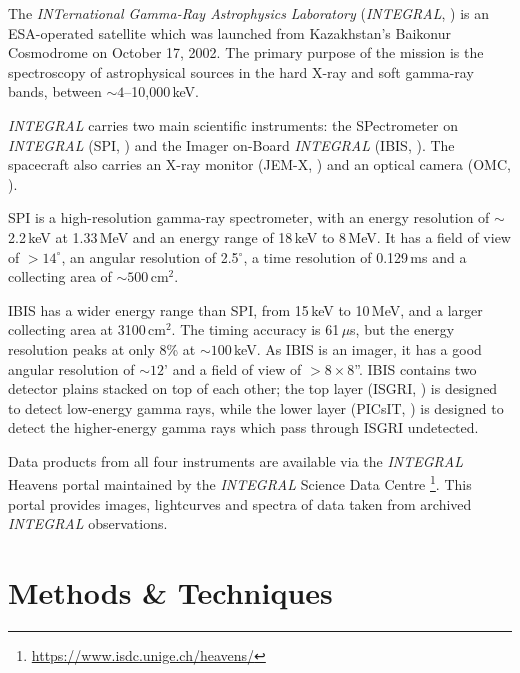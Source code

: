 \par The \textit{INTernational Gamma-Ray Astrophysics Laboratory} (\textit{INTEGRAL}, \citealp{Winkler_INTEGRAL}) is an ESA-operated satellite which was launched from Kazakhstan's Baikonur Cosmodrome on October 17, 2002.  The primary purpose of the mission is the spectroscopy of astrophysical sources in the hard X-ray and soft gamma-ray bands, between $\sim4$--10,000\,keV.
\par \textit{INTEGRAL} carries two main scientific instruments: the SPectrometer on \textit{INTEGRAL} (SPI, \citealp{Vedrenne_SPI}) and the Imager on-Board \textit{INTEGRAL} (IBIS, \citealp{Winkler_IBIS}).  The spacecraft also carries an X-ray monitor (JEM-X, \citealp{Schnopper_JEMX}) and an optical camera (OMC, \citealp{Gimenez_OMC}).
\par SPI is a high-resolution gamma-ray spectrometer, with an energy resolution of $\sim$2.2\,keV at 1.33\,MeV and an energy range of 18\,keV to 8\,MeV.  It has a field of view of $>14^\circ$, an angular resolution of 2.5$^\circ$, a time resolution of 0.129\,ms and a collecting area of $\sim500$\,cm$^2$.
\par IBIS has a wider energy range than SPI, from 15\,keV to 10\,MeV, and a larger collecting area at 3100\,cm$^2$.  The timing accuracy is 61\,$\mu$s, but the energy resolution peaks at only 8\% at $\sim100$\,keV.  As IBIS is an imager, it has a good angular resolution of $\sim12$' and a field of view of $>8\times8$''.  IBIS contains two detector plains stacked on top of each other; the top layer (ISGRI, \citealp{Lebrun_ISGRI}) is designed to detect low-energy gamma rays, while the lower layer (PICsIT, \citealp{Labanti_Picsit}) is designed to detect the higher-energy gamma rays which pass through ISGRI undetected.
\par Data products from all four instruments are available via the \textit{INTEGRAL} Heavens portal \citep{Lubinski_Heavens} maintained by the \textit{INTEGRAL} Science Data Centre \footnote{\url{https://www.isdc.unige.ch/heavens/}}.  This portal provides images, lightcurves and spectra of data taken from archived \textit{INTEGRAL} observations.

\section{Methods \& Techniques}

\label{sec:tec}

